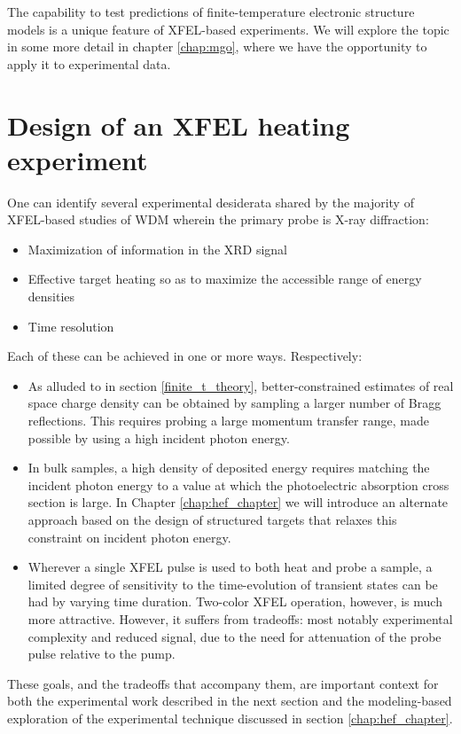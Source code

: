 \documentclass [11pt, proquest, article] {uwthesis}[2016/11/22]
\begin{document}
The capability to test predictions of finite-temperature electronic structure models is a unique feature of XFEL-based experiments. We will explore the topic in some more detail in chapter \ref{chap:mgo}, where we have the opportunity to apply it to experimental data. 

\section{Design of an XFEL heating experiment}
One can identify several experimental desiderata shared by the majority of XFEL-based studies of WDM wherein the primary probe is X-ray diffraction:

\begin{itemize}
\item{Maximization of information in the XRD signal}
\item{Effective target heating so as to maximize the accessible range of energy densities}
\item{Time resolution}
\end{itemize}

Each of these can be achieved in one or more ways. Respectively:

\begin{itemize}
\item{As alluded to in section \ref{finite_t_theory}, better-constrained estimates of real space charge density can be obtained by sampling a larger number of Bragg reflections. This requires probing a large momentum transfer range, made possible by using a high incident photon energy.}
\item{In bulk samples, a high density of deposited energy requires matching the incident photon energy to a value at which the photoelectric absorption cross section is large. In Chapter \ref{chap:hef_chapter} we will introduce an alternate approach based on the design of structured targets that relaxes this constraint on incident photon energy.}
\item{Wherever a single XFEL pulse is used to both heat and probe a sample, a limited degree of sensitivity to the time-evolution of transient states can be had by varying time duration. Two-color XFEL operation, however, is much more attractive. However, it suffers from tradeoffs: most notably experimental complexity and reduced signal, due to the need for attenuation of the probe pulse relative to the pump. }
\end{itemize}
These goals, and the tradeoffs that accompany them, are important context for both the experimental work described in the next section and the modeling-based exploration of the experimental technique discussed in section \ref{chap:hef_chapter}.
\end{document}
